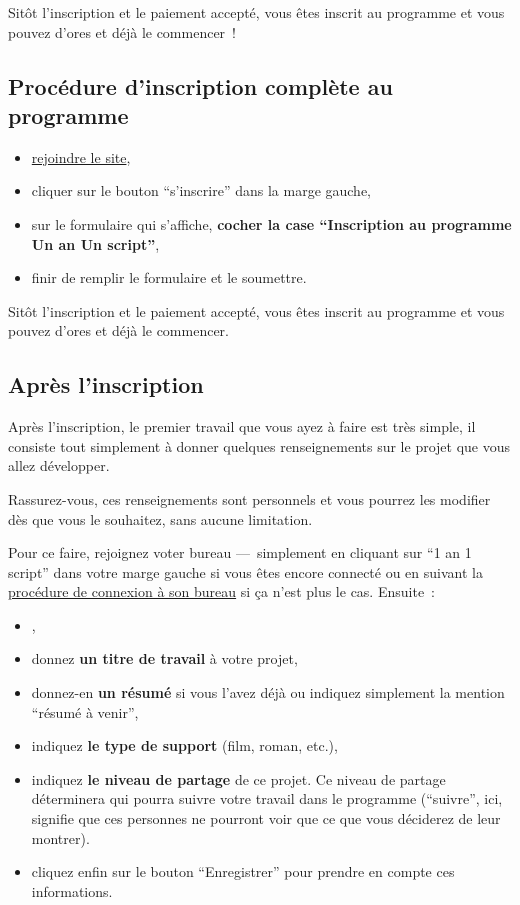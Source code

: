 Sitôt l'inscription et le paiement accepté, vous êtes inscrit au programme et vous pouvez d'ores et déjà le commencer~{}!

\subsection{Procédure d'inscription complète au programme}\hypertarget{procedure-inscription-complete}{}\label{procedure-inscription-complete}

\begin{itemize}
\item \hyperlink{rejoindre-site}{rejoindre le site},
\item cliquer sur le bouton ``s'inscrire'' dans la marge gauche,
\item sur le formulaire qui s'affiche, \textbf{cocher la case ``Inscription au programme Un an Un script''},
\item finir de remplir le formulaire et le soumettre.
\end{itemize}

Sitôt l'inscription et le paiement accepté, vous êtes inscrit au programme et vous pouvez d'ores et déjà le commencer.

\subsection{Après l'inscription}\hypertarget{premiers-pas-apres-inscription}{}\label{premiers-pas-apres-inscription}

Après l'inscription, le premier travail que vous ayez à faire est très simple, il consiste tout simplement à donner quelques renseignements sur le projet que vous allez développer.

Rassurez-vous, ces renseignements sont personnels et vous pourrez les modifier dès que vous le souhaitez, sans aucune limitation.

Pour ce faire, rejoignez voter bureau —~{}simplement en cliquant sur ``1 an 1 script'' dans votre marge gauche si vous êtes encore connecté ou en suivant la \hyperlink{rejoindre-bureau-travail}{procédure de connexion à son bureau} si ça n'est plus le cas. Ensuite~{}:

\begin{itemize}
\item {},
\item donnez \textbf{un titre de travail} à votre projet,
\item donnez-en \textbf{un résumé} si vous l'avez déjà ou indiquez simplement la mention ``résumé à venir'',
\item indiquez \textbf{le type de support} (film, roman, etc.),
\item indiquez \textbf{le niveau de partage} de ce projet. Ce niveau de partage déterminera qui pourra suivre votre travail dans le programme (``suivre'', ici, signifie que ces personnes ne pourront voir que ce que vous déciderez de leur montrer).
\item cliquez enfin sur le bouton ``Enregistrer'' pour prendre en compte ces informations.
\end{itemize}

